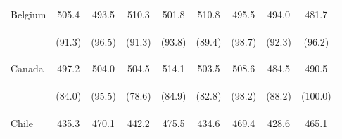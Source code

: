 \begin{center}
\begin{tabular}{lcccccccc}
\noalign{\smallskip}Belgium & 505.4 & 493.5 & 510.3 & 501.8 & 510.8 & 495.5 & 494.0 & 481.7\\
 & \begin{footnotesize}(91.3)\end{footnotesize} & \begin{footnotesize}(96.5)\end{footnotesize} & \begin{footnotesize}(91.3)\end{footnotesize} & \begin{footnotesize}(93.8)\end{footnotesize} & \begin{footnotesize}(89.4)\end{footnotesize} & \begin{footnotesize}(98.7)\end{footnotesize} & \begin{footnotesize}(92.3)\end{footnotesize} & \begin{footnotesize}(96.2)\end{footnotesize}\\
\noalign{\smallskip}Canada & 497.2 & 504.0 & 504.5 & 514.1 & 503.5 & 508.6 & 484.5 & 490.5\\
 & \begin{footnotesize}(84.0)\end{footnotesize} & \begin{footnotesize}(95.5)\end{footnotesize} & \begin{footnotesize}(78.6)\end{footnotesize} & \begin{footnotesize}(84.9)\end{footnotesize} & \begin{footnotesize}(82.8)\end{footnotesize} & \begin{footnotesize}(98.2)\end{footnotesize} & \begin{footnotesize}(88.2)\end{footnotesize} & \begin{footnotesize}(100.0)\end{footnotesize}\\
\noalign{\smallskip}Chile & 435.3 & 470.1 & 442.2 & 475.5 & 434.6 & 469.4 & 428.6 & 465.1\\

\end{tabular}
\end{center}
